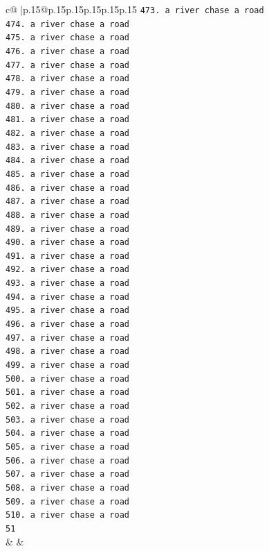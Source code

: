 \documentclass{article}
\begin{document}
{\begin{supertabular}{c@{$\;$}|p{.15\linewidth}@{}p{.15\linewidth}p{.15\linewidth}p{.15\linewidth}p{.15\linewidth}p{.15\linewidth}}
{{{\texttt{473. a river chase a road} \\
\texttt{474. a river chase a road} \\
\texttt{475. a river chase a road} \\
\texttt{476. a river chase a road} \\
\texttt{477. a river chase a road} \\
\texttt{478. a river chase a road} \\
\texttt{479. a river chase a road} \\
\texttt{480. a river chase a road} \\
\texttt{481. a river chase a road} \\
\texttt{482. a river chase a road} \\
\texttt{483. a river chase a road} \\
\texttt{484. a river chase a road} \\
\texttt{485. a river chase a road} \\
\texttt{486. a river chase a road} \\
\texttt{487. a river chase a road} \\
\texttt{488. a river chase a road} \\
\texttt{489. a river chase a road} \\
\texttt{490. a river chase a road} \\
\texttt{491. a river chase a road} \\
\texttt{492. a river chase a road} \\
\texttt{493. a river chase a road} \\
\texttt{494. a river chase a road} \\
\texttt{495. a river chase a road} \\
\texttt{496. a river chase a road} \\
\texttt{497. a river chase a road} \\
\texttt{498. a river chase a road} \\
\texttt{499. a river chase a road} \\
\texttt{500. a river chase a road} \\
\texttt{501. a river chase a road} \\
\texttt{502. a river chase a road} \\
\texttt{503. a river chase a road} \\
\texttt{504. a river chase a road} \\
\texttt{505. a river chase a road} \\
\texttt{506. a river chase a road} \\
\texttt{507. a river chase a road} \\
\texttt{508. a river chase a road} \\
\texttt{509. a river chase a road} \\
\texttt{510. a river chase a road} \\
\texttt{51} \\
            }
        }
    }
    & & \\ \\


\end{supertabular}}
\end{document}
